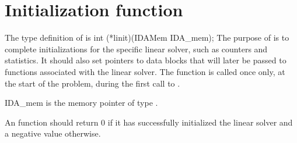 
\section{Initialization function}
The type definition of  is
{
  int (*linit)(IDAMem IDA\_mem);
}
{
  The purpose of  is to complete initializations for
  the specific linear solver, such as counters and statistics.
  It should also set pointers to data blocks that will later be
  passed to functions associated with the linear solver.
  The  function is called once only, at the start of
  the problem, during the first call to .
}
{
  \begin{args}
  \item[IDA\_mem]
    is the {\idas} memory pointer of type .
  \end{args}
}
{
  An  function should return 0 if it 
  has successfully initialized the {\idas} linear solver and 
  a negative value otherwise. 
}
{}


